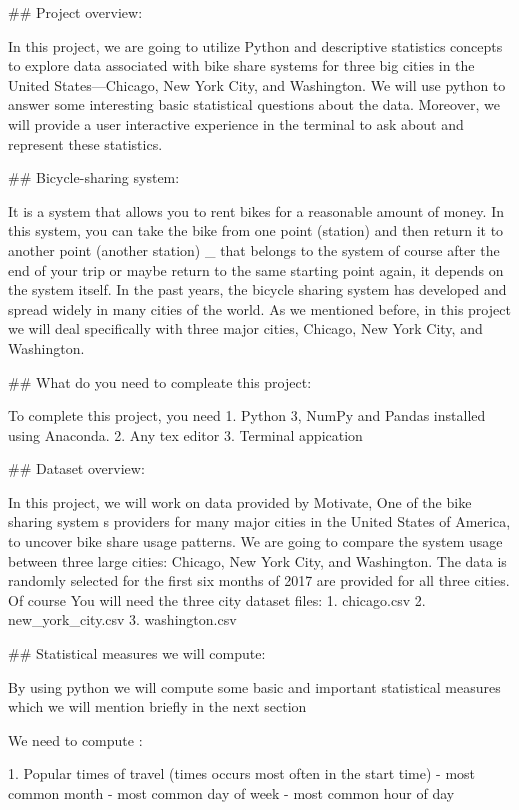 ## Project overview: 

In this project, we are going to utilize Python and descriptive statistics concepts to explore data associated with bike share systems for three big cities in the United States—Chicago, New York City, and Washington. 
We will use python to answer some interesting basic statistical questions about the data.
Moreover, we will provide a user interactive experience in the terminal to ask about and represent these statistics.

## Bicycle-sharing system: 

It is a system that allows you to rent bikes for a reasonable amount of money.
In this system, you can take the bike from one point (station) and then return it to another point (another station) _ that belongs to the system of course after the end of your trip or maybe return to the same starting point again, it depends on the system itself.
In the past years, the bicycle sharing system has developed and spread widely in many cities of the world.
As we mentioned before, in this project we will deal specifically with three major cities, Chicago, New York City, and Washington.

## What do you need to compleate this project: 

To complete this project, you need 
1. Python 3, NumPy and Pandas installed using Anaconda.
2. Any tex editor
3. Terminal appication

## Dataset overview: 

In this project, we will work on data provided by Motivate, One of the bike sharing system s providers for many major cities in the United States of America, to uncover bike share usage patterns. 
We are going to compare the system usage between three large cities: Chicago, New York City, and Washington.
The data is randomly selected for the first six months of 2017 are provided for all three cities.
Of course You will need the three city dataset files:
1. chicago.csv
2. new_york_city.csv
3. washington.csv

## Statistical measures we will compute: 

By using python we will compute some basic and important statistical measures 
 which we will mention briefly in the next section 

We need to compute :

1. Popular times of travel (times occurs most often in the start time)
  - most common month
  - most common day of week
  - most common hour of day

